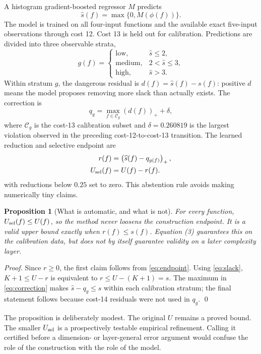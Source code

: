 \documentclass[11pt]{article}
\newtheorem{proposition}{Proposition}
\newcommand{\pos}[1]{\left(#1\right)_+}
\begin{document}
A histogram gradient-boosted regressor $M$ \cite{friedman2001} predicts
\[
 \widehat s(f)=\max\{0,M(\phi(f))\}.
\]
The model is trained on all four-input functions and the available exact
five-input observations through cost 12.  Cost 13 is held out for calibration.
Predictions are divided into three observable strata,
\[
 g(f)=\begin{cases}
 \mathrm{low},&\widehat s\le2,\\
 \mathrm{medium},&2<\widehat s\le3,\\
 \mathrm{high},&\widehat s>3.
 \end{cases}
\]
Within stratum $g$, the dangerous residual is
$d(f)=\widehat s(f)-s(f)$: positive $d$ means the model proposes removing
more slack than actually exists.  The correction is
\begin{equation}
 q_g=\max_{f\in\mathcal C_g}\pos{d(f)}+\delta,
 \label{eq:correction}
\end{equation}
where $\mathcal C_g$ is the cost-13 calibration subset and
$\delta=0.260819$ is the largest violation observed in the preceding
cost-12-to-cost-13 transition.  The learned reduction and selective endpoint
are
\begin{align}
 r(f)&=\pos{\widehat s(f)-q_{g(f)}},\label{eq:reduction}\\
 U_{\rm sel}(f)&=U(f)-r(f).\label{eq:endpoint}
\end{align}
with reductions below $0.25$ set to zero.  This abstention rule avoids making
numerically tiny claims.

\begin{proposition}[What is automatic, and what is not]
For every function, $U_{\rm sel}(f)\le U(f)$, so the method never loosens the
construction endpoint.  It is a valid upper bound exactly when
$r(f)\le s(f)$.  Equation (3) guarantees this on the calibration data, but
does not by itself guarantee validity on a later complexity layer.
\end{proposition}
\emph{Proof.}  Since $r\ge0$, the first claim follows from
\eqref{eq:endpoint}.  Using \eqref{eq:slack}, $K+1\le U-r$ is equivalent to
$r\le U-(K+1)=s$.  The maximum in \eqref{eq:correction} makes
$\widehat s-q_g\le s$ within each calibration stratum; the final statement
follows because cost-14 residuals were not used in $q_g$. \qed

The proposition is deliberately modest.  The original $U$ remains a proved
bound.  The smaller $U_{\rm sel}$ is a prospectively testable empirical
refinement.  Calling it certified before a dimension- or layer-general error
argument would confuse the role of the construction with the role of the
model.
\end{document}
